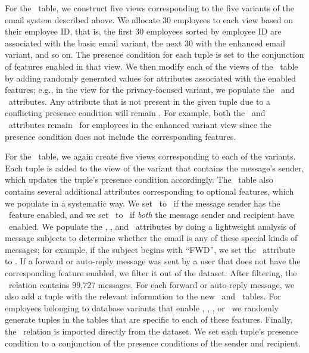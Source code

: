 For the \employees\ table, we construct five views corresponding to the five
variants of the email system described above. We allocate 30 employees to each
view based on their employee ID, that is, the first 30 employees sorted by
employee ID are associated with the basic email variant, the next 30 with the
enhanced email variant, and so on. The presence condition for each tuple is set
to the conjunction of features enabled in that view.
%
We then modify each of the views of the \employees\ table by adding randomly
generated values for attributes associated with the enabled features; 
e.g., in the view for the privacy-focused variant, we populate the
\verificationkey\ and \publickey\ attributes.
%
Any attribute that is not present in the given tuple due to a conflicting
presence condition will remain \NULL. For example, both the \verificationkey\
and \publickey\ attributes remain \NULL\ for employees in the enhanced variant
view since the presence condition does not include the corresponding features.


For the \messages\ table, we again create five views corresponding to each of
the variants. Each tuple is added to the view of the variant that contains the
message's sender, which updates the tuple's presence condition accordingly.
%
The \messages\ table also contains several additional attributes corresponding
to optional features, which we populate in a systematic way.
%
We set \issigned\ to \tru\ if the message sender has the \fsignature\ feature
enabled, and we set \isencrypted\ to \tru\ if \emph{both} the message sender
and recipient have \fencryption\ enabled.
%
We populate the \isforwardmsg, \isautoresponse, and \issystemnotification\
attributes by doing a lightweight analysis of message subjects to determine
whether the email is any of these special kinds of messages; for example, if
the subject begins with ``FWD'', we set the \isforwardmsg\ attribute to \tru.
%
If a forward or auto-reply message was sent by a user that does not have the
corresponding feature enabled, we filter it out of the dataset. After
filtering, the \messages\ relation contains 99,727 messages.
%
For each forward or auto-reply message, we also add a tuple with the relevant
information to the new \forwardmsg\ and \automsg\ tables.
%
For employees belonging to database variants that enable \remailmessage,
\autoresponder, \addressbook, or \mailhost\ we randomly generate tuples in the
tables that are specific to each of these features.
%
Finally, the \recipientinfo\ relation is imported directly from the dataset. We
set each tuple's presence condition to a conjunction of the presence conditions
of the sender and recipient.


